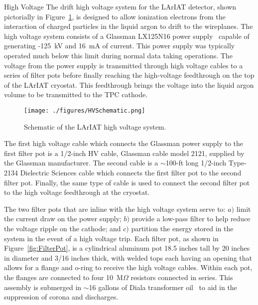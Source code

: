 \begin{subsubsection}{High Voltage}\label{sec:DriftVoltage}
The drift high voltage system for the LArIAT detector, shown pictorially in Figure~\ref{fig:HVScheme}, is designed to allow ionization electrons from the interaction of charged particles in the liquid argon to drift to the wireplanes. The high voltage system consists of a Glassman LX125N16 power supply~\cite{GlassmanPS} capable of generating -125~kV and 16~mA of current. This power supply was typically operated much below this limit during normal data taking operations. The voltage from the power supply is transmitted through high voltage cables to a series of filter pots before finally reaching the high-voltage feedthrough on the top of the LArIAT cryostat. This feedthrough brings the voltage into the liquid argon volume to be transmitted to the TPC cathode.


\begin{figure}[htb]
\centering
\texttt{[image: ./figures/HVSchematic.png]}\\
\caption{Schematic of the LArIAT high voltage system.}
\label{fig:HVScheme}
\end{figure}%

The first high voltage cable which connects the Glassman power supply to the first filter pot is a 1/2-inch HV cable, Glassman cable model 2121, supplied by the Glassman manufacturer. The second cable is a $\sim$100-ft long 1/2-inch Type-2134 Dielectric Sciences cable which connects the first filter pot to the second filter pot. Finally, the same type of cable is used to connect the second filter pot to the high voltage feedthrough at the cryostat.

The two filter pots that are inline with the high voltage system serve to: $a)$ limit the current draw on the power supply; $b)$  provide a low-pass filter to help reduce the voltage ripple on the cathode; and $c)$ partition the energy stored in the system in the event of a high voltage trip. Each filter pot, as shown in Figure~\ref{fig:FilterPot}, is a cylindrical aluminum pot 18.5 inches tall by 20 inches in diameter and 3/16 inches thick, with welded tops each having an opening that allows for a flange and o-ring to receive the high voltage cables. Within each pot, the flanges are connected to four 10~M$\Omega$ resistors connected in series. This assembly is submerged in $\sim$16 gallons of Diala transformer oil~\cite{ShellDiala} to aid in the suppression of corona and discharges.


\end{subsubsection}
